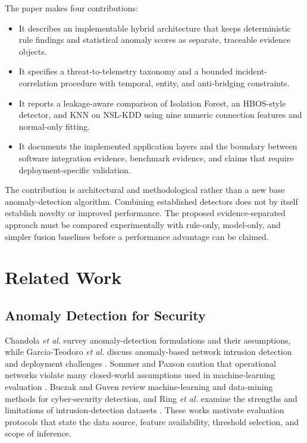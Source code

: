\documentclass[conference]{IEEEtran}
\begin{document}
The paper makes four contributions:
\begin{itemize}
\item It describes an implementable hybrid architecture that keeps deterministic rule findings and statistical anomaly scores as separate, traceable evidence objects.
\item It specifies a threat-to-telemetry taxonomy and a bounded incident-correlation procedure with temporal, entity, and anti-bridging constraints.
\item It reports a leakage-aware comparison of Isolation Forest, an HBOS-style detector, and KNN on NSL-KDD using nine numeric connection features and normal-only fitting.
\item It documents the implemented application layers and the boundary between software integration evidence, benchmark evidence, and claims that require deployment-specific validation.
\end{itemize}

The contribution is architectural and methodological rather than a new base anomaly-detection algorithm. Combining established detectors does not by itself establish novelty or improved performance. The proposed evidence-separated approach must be compared experimentally with rule-only, model-only, and simpler fusion baselines before a performance advantage can be claimed.

\section{Related Work}
\subsection{Anomaly Detection for Security}
Chandola \emph{et al.} survey anomaly-detection formulations and their assumptions, while Garcia-Teodoro \emph{et al.} discuss anomaly-based network intrusion detection and deployment challenges \cite{chandola2009anomaly,garcia2009anomaly}. Sommer and Paxson caution that operational networks violate many closed-world assumptions used in machine-learning evaluation \cite{sommer2010outside}. Buczak and Guven review machine-learning and data-mining methods for cyber-security detection, and Ring \emph{et al.} examine the strengths and limitations of intrusion-detection datasets \cite{buczak2016survey,ring2019survey}. These works motivate evaluation protocols that state the data source, feature availability, threshold selection, and scope of inference.
\end{document}
